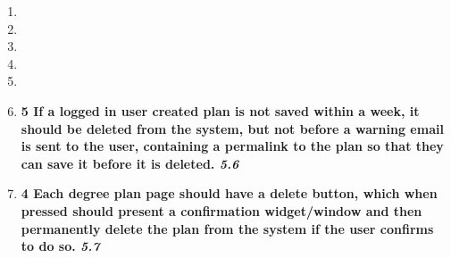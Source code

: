 \documentclass[12pt,titlepage]{article}
\newenvironment{storyPoint}
   {\color{blue} \bfseries}
   {}
\newenvironment{storyId}
   {\color{Bittersweet} \itshape}
   {}
\begin{document}
\newcommand{\storyFivePointSix}{
   \begin{storyPoint}5\end{storyPoint}
   If a logged in user created plan is not saved within a week, it should be
   deleted from the system, but not before a warning email is sent to the user,
   containing a permalink to the plan so that they can save it before it is
   deleted.
   \begin{storyId}5.6\end{storyId}
}
\newcommand{\storyFivePointSeven}{
   \begin{storyPoint}4\end{storyPoint}
   Each degree plan page should have a delete button, which when pressed should
   present a confirmation widget/window and then permanently delete the plan
   from the system if the user confirms to do so.
   \begin{storyId}5.7\end{storyId}
}

\begin{enumerate}
   \item \storyFivePointOne{}
   \item \storyFivePointTwo{}
   \item \storyFivePointThree{}
   \item \storyFivePointFour{}
   \item \storyFivePointFive{}
   \item \storyFivePointSix{}
   \item \storyFivePointSeven{}
\end{enumerate}

\subsection{\epicSix{}}

\newcommand{\storySixPointOne}{
   \begin{storyPoint}1\end{storyPoint}
   There should be a button on every degree plan page that says something along
   the lines of ``Export as PDF''.
   \begin{storyId}6.1\end{storyId}
}
\newcommand{\storySixPointTwo}{
   \begin{storyPoint}5\end{storyPoint}
   When pressed, a new browser tab should be opened and a PDF of the current
   degree plan should be present in the tab (allowing the user to save it to
   their computer if they wish).
   \begin{storyId}6.2\end{storyId}
}
\end{document}
